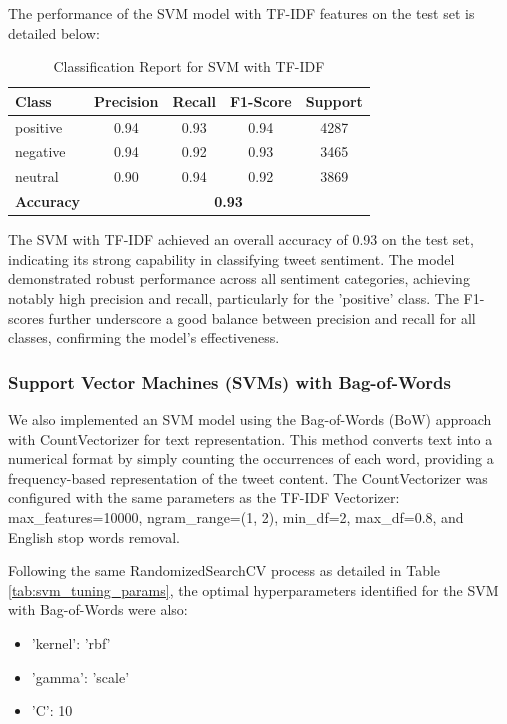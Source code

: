 The performance of the SVM model with TF-IDF features on the test set is detailed below:

\begin{table}[H]
\centering
\caption{Classification Report for SVM with TF-IDF}
\begin{tabular}{|l|c|c|c|c|}
\hline
\textbf{Class} & \textbf{Precision} & \textbf{Recall} & \textbf{F1-Score} & \textbf{Support} \\
\hline
positive & 0.94 & 0.93 & 0.94 & 4287 \\
negative & 0.94 & 0.92 & 0.93 & 3465 \\
neutral  & 0.90 & 0.94 & 0.92 & 3869 \\
\hline
\textbf{Accuracy} & \multicolumn{4}{|c|}{\textbf{0.93}} \\
\hline
\end{tabular}
\label{tab:svm_tfidf_report}
\end{table}

The SVM with TF-IDF achieved an overall accuracy of 0.93 on the test set, indicating its strong capability in classifying tweet sentiment. The model demonstrated robust performance across all sentiment categories, achieving notably high precision and recall, particularly for the 'positive' class. The F1-scores further underscore a good balance between precision and recall for all classes, confirming the model's effectiveness.

\subsubsection{\textbf{Support Vector Machines (SVMs) with Bag-of-Words}}

We also implemented an SVM model using the Bag-of-Words (BoW) approach with CountVectorizer for text representation. This method converts text into a numerical format by simply counting the occurrences of each word, providing a frequency-based representation of the tweet content. The CountVectorizer was configured with the same parameters as the TF-IDF Vectorizer: max\_features=10000, ngram\_range=(1, 2), min\_df=2, max\_df=0.8, and English stop words removal.

Following the same RandomizedSearchCV process as detailed in Table \ref{tab:svm_tuning_params}, the optimal hyperparameters identified for the SVM with Bag-of-Words were also:
\begin{itemize}
    \item 'kernel': 'rbf'
    \item 'gamma': 'scale'
    \item 'C': 10
\end{itemize}

